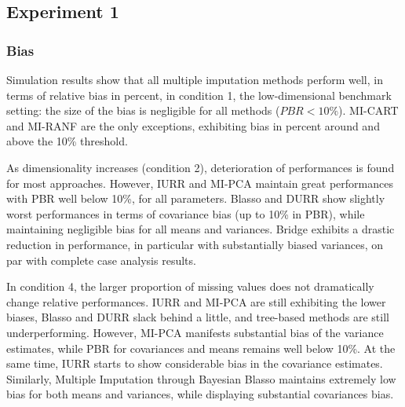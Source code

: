 \maketitle
\subsection{Experiment 1}

\subsubsection{Bias}

Simulation results show that all multiple imputation methods perform well, in terms of relative bias in percent, in condition 1, 
the low-dimensional benchmark setting: the size of the bias is negligible for all methods ($PBR < 10\%$). MI-CART 
and MI-RANF are the only exceptions, exhibiting bias in percent around and above the 10\% threshold.

As dimensionality increases (condition 2), deterioration of performances is found for most approaches. 
However, IURR and MI-PCA maintain great performances with PBR well below 10\%, for all parameters. Blasso
and DURR show slightly worst performances in terms of covariance bias (up to 10\% in PBR), while maintaining negligible bias 
for all means and variances. Bridge exhibits a drastic reduction in performance, in particular with substantially biased 
variances, on par with complete case analysis results.

In condition 4, the larger proportion of missing values does not dramatically change relative performances.
IURR and MI-PCA are still exhibiting the lower biases, Blasso and DURR slack behind a little, and tree-based 
methods are still underperforming. However, MI-PCA manifests substantial bias of the variance estimates, while 
PBR for covariances and means remains well below 10\%. At the same time, IURR starts to show considerable 
bias in the covariance estimates. Similarly, Multiple Imputation through Bayesian Blasso maintains extremely 
low bias for both means and variances, while displaying substantial covariances bias.


